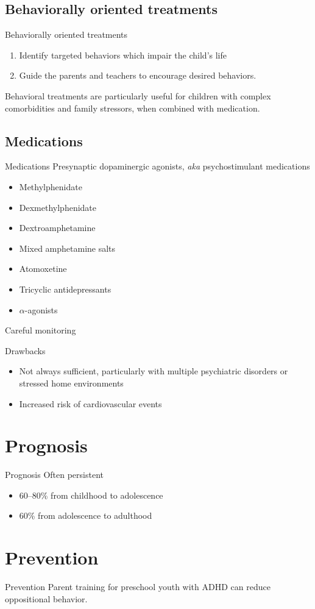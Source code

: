 \documentclass{beamer}
\begin{document}
\subsection{Behaviorally oriented treatments}
\begin{frame}{Behaviorally oriented treatments}
\begin{enumerate}
    \item Identify targeted behaviors which impair the child's life
    \item Guide the parents and teachers to encourage desired behaviors.
\end{enumerate}

Behavioral treatments are particularly useful for children with complex
comorbidities and family stressors, when combined with medication.
\end{frame}

\subsection{Medications}
\begin{frame}{Medications}
Presynaptic dopaminergic agonists, \textit{aka} psychostimulant medications

\begin{itemize}
    \item Methylphenidate
    \item Dexmethylphenidate
    \item Dextroamphetamine
    \item Mixed amphetamine salts
    \item Atomoxetine
    \item Tricyclic antidepressants
    \item $\alpha$-agonists
\end{itemize}

Careful monitoring
\end{frame}

\begin{frame}{Drawbacks}
\begin{itemize}
    \item Not always sufficient, particularly with multiple psychiatric
        disorders or stressed home environments
    \item Increased risk of cardiovascular events
\end{itemize}
\end{frame}

\section{Prognosis}
\begin{frame}{Prognosis}
Often persistent

\begin{itemize}
    \item 60--80\% from childhood to adolescence
    \item 60\% from adolescence to adulthood
\end{itemize}
\end{frame}

\section{Prevention}
\begin{frame}{Prevention}
Parent training for preschool youth with ADHD can reduce oppositional behavior.
\end{frame}
\end{document}
